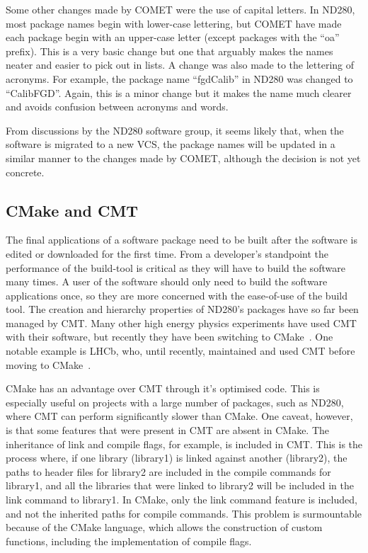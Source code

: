 \documentclass[aps,pra,12pt,notitlepage,tightenlines]{revtex4-1}
\begin{document}
Some other changes made by COMET were the use of capital letters. In ND280, most package names begin with lower-case lettering, but COMET have made each package begin with an upper-case letter (except packages with the ``oa'' prefix). This is a very basic change but one that arguably makes the names neater and easier to pick out in lists. A change was also made to the lettering of acronyms. For example, the package name ``fgdCalib'' in ND280 was changed to ``CalibFGD''. Again, this is a minor change but it makes the name much clearer and avoids confusion between acronyms and words.

From discussions by the ND280 software group, it seems likely that, when the software is migrated to a new VCS, the package names will be updated in a similar manner to the changes made by COMET, although the decision is not yet concrete.

\subsection{CMake and CMT}
The final applications of a software package need to be built after the software is edited or downloaded for the first time. From a developer's standpoint the performance of the build-tool is critical as they will have to build the software many times. A user of the software should only need to build the software applications once, so they are more concerned with the ease-of-use of the build tool. The creation and hierarchy properties of ND280's packages have so far been managed by CMT. Many other high energy physics experiments have used CMT with their software, but recently they have been switching to CMake~\cite{CMake}. One notable example is LHCb, who, until recently, maintained and used CMT before moving to CMake~\cite{Clemencic2012}.

CMake has an advantage over CMT through it's optimised code. This is especially useful on projects with a large number of packages, such as ND280, where CMT can perform significantly slower than CMake. One caveat, however, is that some features that were present in CMT are absent in CMake. The inheritance of link and compile flags, for example, is included in CMT. This is the process where, if one library (library1) is linked against another (library2), the paths to header files for library2 are included in the compile commands for library1, and all the libraries that were linked to library2 will be included in the link command to library1. In CMake, only the link command feature is included, and not the inherited paths for compile commands. This problem is surmountable because of the CMake language, which allows the construction of custom functions, including the implementation of compile flags. 
\end{document}
